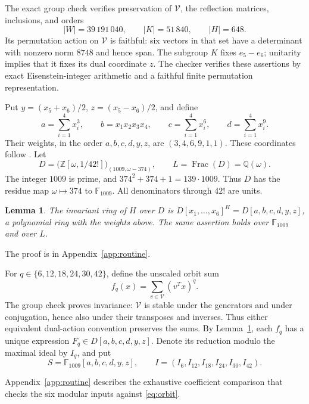 \documentclass[11pt]{article}
\newtheorem{lemma}[theorem]{Lemma}
\theoremstyle{definition}
\newcommand{\Q}{\mathbb Q}
\newcommand{\Z}{\mathbb Z}
\newcommand{\F}{\mathbb F}
\newcommand{\Frac}{\operatorname{Frac}}
\newcommand{\degrees}{\{6,12,18,24,30,42\}}
\begin{document}
The exact group check verifies preservation of $\mathcal V$, the
reflection matrices, inclusions, and orders
\begin{equation}\label{eq:orders}
             |W|=39\,191\,040,\qquad |K|=51\,840,
                         \qquad |H|=648.
\end{equation}
Its permutation action on $\mathcal V$ is faithful: six vectors in
that set have a determinant with nonzero norm $8748$ and hence span.
The subgroup $K$ fixes $e_5-e_6$; unitarity implies that it fixes its
dual coordinate $z$. The checker verifies these assertions by exact
Eisenstein-integer arithmetic and a faithful finite permutation
representation.

Put $y=(x_5+x_6)/2$, $z=(x_5-x_6)/2$, and define
\[
 a=\sum_{i=1}^4x_i^3,\qquad b=x_1x_2x_3x_4,\qquad
 c=\sum_{i=1}^4x_i^6,\qquad d=\sum_{i=1}^4x_i^9.
\]
Their weights, in the order $a,b,c,d,y,z$, are $(3,4,6,9,1,1)$.
These coordinates follow \cite[\S6.2]{OS}.
Let
\[
 D=\bigl(\Z[\omega,1/42!]\bigr)_{(1009,\omega-374)},
                   \qquad L=\Frac(D)=\Q(\omega).
\]
The integer $1009$ is prime, and
$374^2+374+1=139\cdot1009$. Thus $D$ has the residue map
$\omega\mapsto374$ to $\F_{1009}$. All denominators through $42!$
are units.

\begin{lemma}\label{lem:Hinv}
The invariant ring of $H$ over $D$ is
$D[x_1,\ldots,x_6]^H=D[a,b,c,d,y,z]$, a polynomial ring with the
weights above. The same assertion holds over $\F_{1009}$ and over $L$.
\end{lemma}
The proof is in Appendix~\ref{app:routine}.

For $q\in\degrees$, define the unscaled orbit sum
\begin{equation}\label{eq:orbit}
                 f_q(x)=\sum_{v\in\mathcal V}(v^Tx)^q.
\end{equation}
The group check proves invariance: $\mathcal V$ is stable under the
generators and under conjugation, hence also under their transposes
and inverses. Thus either equivalent dual-action convention preserves
the sums. By Lemma~\ref{lem:Hinv}, each $f_q$ has a unique expression
$F_q\in D[a,b,c,d,y,z]$. Denote its reduction modulo the maximal
ideal by $I_q$, and put
\[
           S=\F_{1009}[a,b,c,d,y,z],\qquad
                         I=(I_6,I_{12},I_{18},I_{24},I_{30},I_{42}).
\]

Appendix~\ref{app:routine} describes the exhaustive coefficient comparison
that checks the six modular inputs against \eqref{eq:orbit}.
\end{document}
